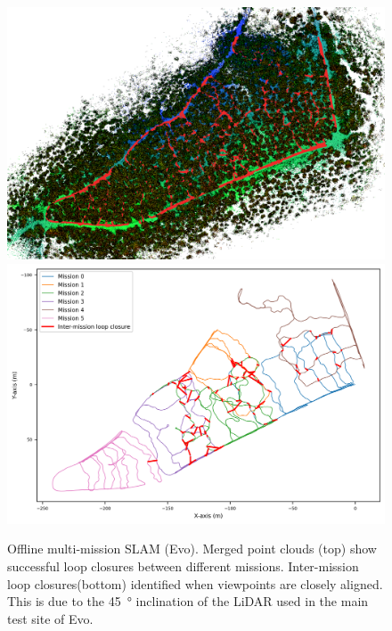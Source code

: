\begin{figure}[htbp]
  \centering
  \includegraphics[width=\columnwidth]{pics/exp_3_offline_evo_pcd.png}
  \includegraphics[width=\columnwidth]{pics/exp_3_1_multimission_slam_evo_ratio.png}
  \caption{Offline multi-mission SLAM (Evo). Merged point clouds (top) show successful loop closures between different missions. Inter-mission loop closures(bottom) identified when viewpoints are closely aligned. This is due to the \SI{45}{\degree} inclination of the LiDAR used in the main test site of Evo. }
  \label{fig:exp_multi_mission_evo}
\end{figure}
\vspace{5pt}

